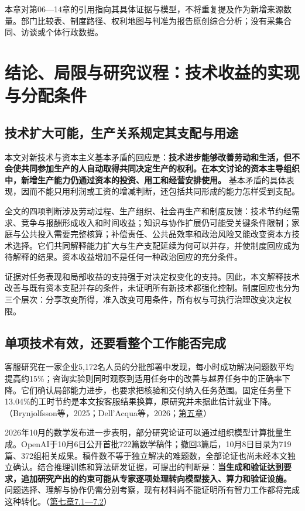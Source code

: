 \documentclass[UTF8,fontset=windows,12pt,a4paper,oneside,openany]{ctexbook}
\begin{document}
本章对第06—14章的引用指向其具体证据与模型，不将重复提及作为新增来源数量。部门比较表、制度路径、权利地图与判准为报告原创综合分析；没有采集合同、访谈或个体行政数据。

\chapter{结论、局限与研究议程：技术收益的实现与分配条件}\label{ch:16}

\section{技术扩大可能，生产关系规定其支配与用途}

本文对新技术与资本主义基本矛盾的回应是：\textbf{技术进步能够改善劳动和生活，但不会使共同参加生产的人自动取得共同决定生产的权利。在本文讨论的资本主导组织中，新增生产能力仍通过资本的投资、用工和经营安排使用。} 基本矛盾的具体表现，因而不能只用利润或工资的增减判断，还包括共同形成的能力怎样受到支配。

全文的四项判断涉及劳动过程、生产组织、社会再生产和制度反馈：技术节约经需求、竞争与报酬形成收入和时间收益；知识与协作扩展仍可能受关键条件限制；家庭与公共投入需要完整核算；补偿责任、公共品效率和政治风险又能改变资本方技术选择。它们共同解释能力扩大与生产支配延续为何可以并存，并使制度回应成为待解释的结果。资本收益增加不是任何一种政治回应的充分条件。

证据对任务表现和局部收益的支持强于对决定权变化的支持。因此，本文解释技术改善与既有资本支配并存的条件，未证明所有新技术都强化控制。制度回应也分为三个层次：分享改变所得，准入改变可用条件，所有权与可执行治理改变决定权限。

\section{单项技术有效，还要看整个工作能否完成}

客服研究在一家企业5,172名人员的分批部署中发现，每小时成功解决问题数平均提高约15\%；咨询实验则同时观察到适用任务中的改善与越界任务中的正确率下降。它们确认局部能力进步，也要求把核验和交付纳入任务范围。固定任务量下13.04\%的工时节约是本文按客服结果换算，原研究并未据此估计就业下降。（Brynjolfsson等，2025；Dell’Acqua等，2026；\hyperref[ch:5]{第五章}）

2026年10月的数学发布进一步表明，部分研究论证可以通过组织模型计算批量生成。OpenAI于10月6日公开首批722篇数学稿件；撤回3篇后，10月8日目录为719篇、372组相关成果。稿件数不等于独立解决的难题数，全部论证也尚未经本文独立确认。结合推理训练和算法研发证据，可提出的判断是：\textbf{当生成和验证达到要求，追加研究产出的约束可能从专家逐项处理转向模型接入、算力和验证设施。} 问题选择、理解与协作仍需分别考察，现有材料尚不能证明所有智力工作都将完成这种转化。（\hyperref[ch:7]{第七章7.1—7.2}）
\end{document}
